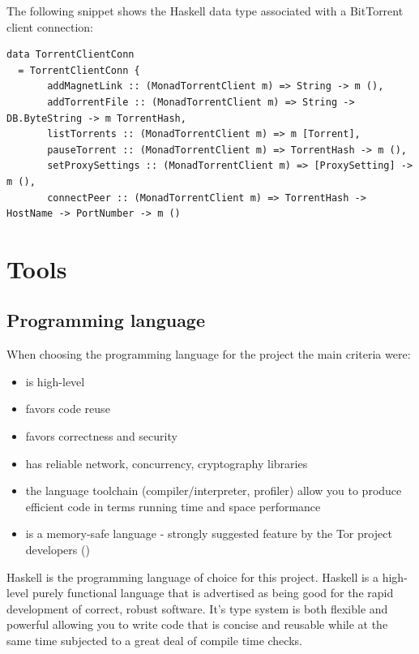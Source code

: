 \documentclass[11pt]{book} %
\begin{document}
The following snippet shows the Haskell  data type associated with a BitTorrent client connection: 

\begin{lstlisting}
data TorrentClientConn
  = TorrentClientConn {
       addMagnetLink :: (MonadTorrentClient m) => String -> m (),
       addTorrentFile :: (MonadTorrentClient m) => String -> DB.ByteString -> m TorrentHash,
       listTorrents :: (MonadTorrentClient m) => m [Torrent],
       pauseTorrent :: (MonadTorrentClient m) => TorrentHash -> m (),
       setProxySettings :: (MonadTorrentClient m) => [ProxySetting] -> m (),
       connectPeer :: (MonadTorrentClient m) => TorrentHash -> HostName -> PortNumber -> m ()
\end{lstlisting}

\section{Tools}


\subsection{Programming language}

When choosing the programming language for the project the main criteria were:

\begin{itemize}
\item is high-level
\item favors code reuse
\item favors correctness and security
\item has reliable network, concurrency, cryptography libraries
\item the language toolchain (compiler/interpreter, profiler) allow you to produce efficient code in terms running time and space performance
\item is a memory-safe language - strongly suggested feature by the Tor project developers (\citep*{web:torPluggableTransports})
\end{itemize}

Haskell is the programming language of choice for this project. Haskell is a high-level purely functional language that is advertised as being good for the rapid development of correct, robust software. It's type system is both flexible and powerful allowing you to write code that is concise and reusable while at the same time subjected to a great deal of compile time checks.
\end{document}
